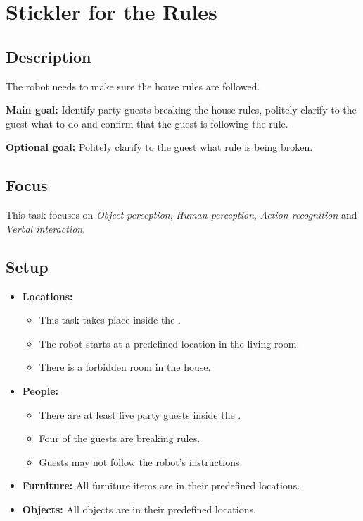 \section{Stickler for the Rules}
\label{test:stickler-for-the-rules}

\subsection*{Description}
The robot needs to make sure the house rules are followed.

\textbf{Main goal:}
Identify party guests breaking the house rules, politely clarify to the guest what to do and confirm that the guest is following the rule.

\textbf{Optional goal:}
Politely clarify to the guest what rule is being broken.


\subsection*{Focus}
This task focuses on
\textit{Object perception},
\textit{Human perception},
\textit{Action recognition} and
\textit{Verbal interaction}.

\subsection*{Setup}
\begin{itemize}[nosep]	
	\item \textbf{Locations:} 
	\begin{itemize}
		\item This task takes place inside the \Arena{}.
		\item The robot starts at a predefined location in the living room.
		\item There is a forbidden room in the house.
	\end{itemize}	 
	\item \textbf{People:} 
	\begin{itemize}
		\item There are at least five party guests inside the \Arena{}.
		\item Four of the guests are breaking rules.
		\item Guests may not follow the robot's instructions.
	\end{itemize}
	\item \textbf{Furniture:} All furniture items are in their predefined locations.
	\item \textbf{Objects:} All objects are in their predefined locations.
\end{itemize}

